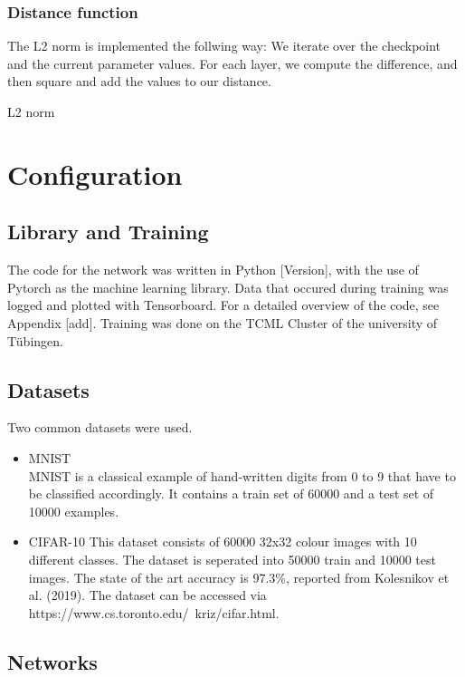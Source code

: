 \subsubsection{Distance function}
The L2 norm is implemented the follwing way: We iterate over the checkpoint and
the current parameter values. For each layer, we compute the difference, and
then square and add the values to our distance.
\begin{algorithm}[htbp]
    \caption{L2 norm}\label{alg:L2Norm}
    \lstset{language=Python}
    
\end{algorithm}



\section{Configuration}

\subsection{Library and Training}
The code for the network was written in Python [Version], with the use of
Pytorch as the machine learning library. Data that occured during training was
logged and plotted with Tensorboard. For a detailed overview of the code, see
Appendix [add]. Training was done on the TCML Cluster of the university of Tübingen.

\subsection{Datasets}
Two common datasets were used.
\begin{itemize}
    \item MNIST \\
    MNIST is a classical example of hand-written digits from 0 to 9 that have to
    be classified accordingly. It contains a train set of 60000 and a test set
    of 10000 examples.
    \item CIFAR-10
    This dataset consists of 60000 32x32 colour images with 10 different
    classes. The dataset is seperated into 50000 train and 10000 test images.
    The state of the art accuracy is 97.3\%, reported from Kolesnikov et al.
    (2019). The dataset can be accessed via https://www.cs.toronto.edu/~kriz/cifar.html.
\end{itemize}
\subsection{Networks}
